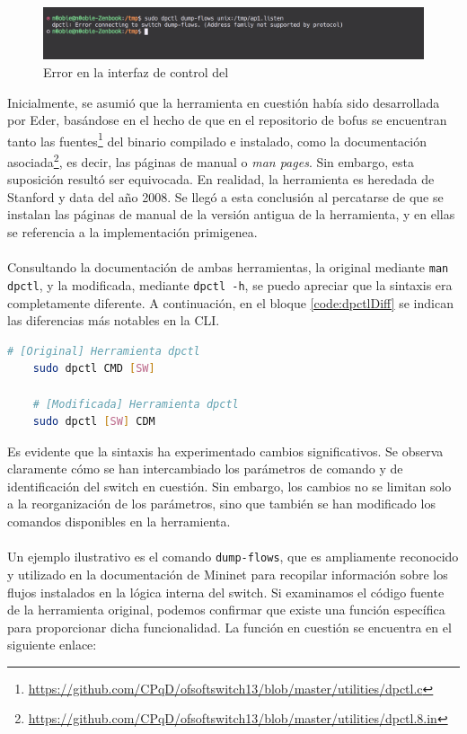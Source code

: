\begin{figure}[ht]
    \centering
    \includegraphics[width=\textwidth]{archivos/img/dev/dpctl_2.png}
    \caption{Error en la interfaz de control del }
    \label{fig:dpctl_2}
\end{figure}


Inicialmente, se asumió que la herramienta en cuestión había sido desarrollada por Eder, basándose en el hecho de que en el repositorio de \gls{bofus} se encuentran tanto las fuentes\footnote{\url{https://github.com/CPqD/ofsoftswitch13/blob/master/utilities/dpctl.c}} del binario compilado e instalado, como la documentación asociada\footnote{\url{https://github.com/CPqD/ofsoftswitch13/blob/master/utilities/dpctl.8.in}}, es decir, las páginas de manual o \textit{man pages}. Sin embargo, esta suposición resultó ser equivocada. En realidad, la herramienta es heredada de Stanford y data del año 2008. Se llegó a esta conclusión al percatarse de que se instalan las páginas de manual de la versión antigua de la herramienta, y en ellas se referencia a la implementación primigenea.\\
\\
Consultando la documentación de ambas herramientas, la original mediante \texttt{man dpctl}, y la modificada, mediante \texttt{dpctl -h}, se puedo apreciar que la sintaxis era completamente diferente. A continuación, en el bloque \ref{code:dpctlDiff} se indican las diferencias más notables en la CLI.

\begin{lstlisting}[language= bash, style=Consola, caption={Diferencias en las herramientas dpctl},label=code:dpctlDiff]
    # [Original] Herramienta dpctl 
    sudo dpctl CMD [SW]

    # [Modificada] Herramienta dpctl 
    sudo dpctl [SW] CDM 
\end{lstlisting}
\vspace{0.5cm}

Es evidente que la sintaxis ha experimentado cambios significativos. Se observa claramente cómo se han intercambiado los parámetros de comando y de identificación del switch en cuestión. Sin embargo, los cambios no se limitan solo a la reorganización de los parámetros, sino que también se han modificado los comandos disponibles en la herramienta.\\
\\
Un ejemplo ilustrativo es el comando \texttt{dump-flows}, que es ampliamente reconocido y utilizado en la documentación de Mininet para recopilar información sobre los flujos instalados en la lógica interna del switch. Si examinamos el código fuente de la herramienta original, podemos confirmar que existe una función específica para proporcionar dicha funcionalidad. La función en cuestión se encuentra en el siguiente enlace:

